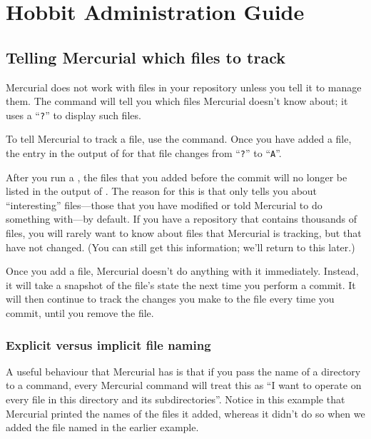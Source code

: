 \chapter{Hobbit Administration Guide}
\label{chap:hbadmin}

\section{Telling Mercurial which files to track}

Mercurial does not work with files in your repository unless you tell
it to manage them.  The  command will tell you which
files Mercurial doesn't know about; it uses a ``\texttt{?}'' to
display such files.

To tell Mercurial to track a file, use the  command.  Once
you have added a file, the entry in the output of  for
that file changes from ``\texttt{?}'' to ``\texttt{A}''.

After you run a , the files that you added before the
commit will no longer be listed in the output of .  The
reason for this is that  only tells you about
``interesting'' files---those that you have modified or told Mercurial
to do something with---by default.  If you have a repository that
contains thousands of files, you will rarely want to know about files
that Mercurial is tracking, but that have not changed.  (You can still
get this information; we'll return to this later.)

Once you add a file, Mercurial doesn't do anything with it
immediately.  Instead, it will take a snapshot of the file's state the
next time you perform a commit.  It will then continue to track the
changes you make to the file every time you commit, until you remove
the file.

\subsection{Explicit versus implicit file naming}

A useful behaviour that Mercurial has is that if you pass the name of
a directory to a command, every Mercurial command will treat this as
``I want to operate on every file in this directory and its
subdirectories''.
Notice in this example that Mercurial printed the names of the files
it added, whereas it didn't do so when we added the file named
 in the earlier example.

